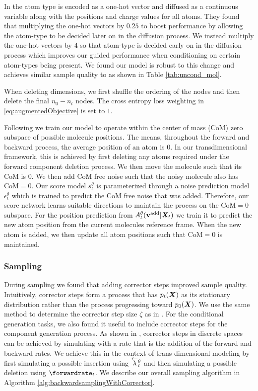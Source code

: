 In \cite{hoogeboom2022equivariant} the atom type is encoded as a one-hot vector and diffused as a continuous variable along with the positions and charge values for all atoms. They found that multiplying the one-hot vectors by $0.25$ to boost performance by allowing the atom-type to be decided later on in the diffusion process. We instead multiply the one-hot vectors by $4$ so that atom-type is decided early on in the diffusion process which improves our guided performance when conditioning on certain atom-types being present. We found our model is robust to this change and achieves similar sample quality to \cite{hoogeboom2022equivariant} as shown in Table \ref{tab:uncond_mol}.

When deleting dimensions, we first shuffle the ordering of the nodes and then delete the final $n_0 - n_t$ nodes. The cross entropy loss weighting in \eqref{eq:augmentedObjective} is set to $1$.

Following \citep{hoogeboom2022equivariant} we train our model to operate within the center of mass (CoM) zero subspace of possible molecule positions. The means, throughout the forward and backward process, the average position of an atom is $0$. In our transdimensional framework, this is achieved by first deleting any atoms required under the forward component deletion process. We then move the molecule such that its CoM is $0$. We then add CoM free noise such that the noisy molecule also has CoM$=0$. Our score model $s_t^\theta$ is parameterized through a noise prediction model $\epsilon_t^\theta$ which is trained to predict the CoM free noise that was added. Therefore, our score network learns suitable directions to maintain the process on the CoM$=0$ subspace. For the position prediction from $A_t^\theta({\mathbf{v}}^{\textup{add}} | {\bm{X}}_t)$ we train it to predict the new atom position from the current molecules reference frame. When the new atom is added, we then update all atom positions such that CoM$=0$ is maintained.

\subsubsection{Sampling}
During sampling we found that adding corrector steps \cite{song2020score} improved sample quality. Intuitively, corrector steps form a process that has $p_t({\bm{X}})$ as its stationary distribution rather than the process progressing toward $p_0({\bm{X}})$. We use the same method to determine the corrector step size $\zeta$ as in \cite{song2020score}. For the conditional generation tasks, we also found it useful to include corrector steps for the component generation process. As shown in \cite{campbell2022continuous}, corrector steps in discrete spaces can be achieved by simulating with a rate that is the addition of the forward and backward rates. We achieve this in the context of trans-dimensional modeling by first simulating a possible insertion using $\overleftarrow{\lambda}_t^\theta$ and then simulating a possible deletion using $\forwardrate_t$. We describe our overall sampling algorithm in Algorithm \ref{alg:backwardsamplingWithCorrector}.

